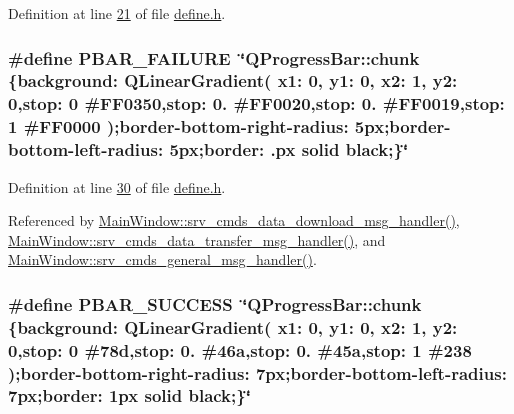Definition at line \hyperlink{a00090_source_l00021}{21} of file \hyperlink{a00090_source}{define.\+h}.

\hypertarget{a00090_aa9f43b2774395af6510910f8feed7cb4}{
\subsubsection[{P\+B\+A\+R\+\_\+\+F\+A\+I\+L\+U\+R\+E}]{\setlength{\rightskip}{0pt plus 5cm}\#define P\+B\+A\+R\+\_\+\+F\+A\+I\+L\+U\+R\+E~\char`\"{}Q\+Progress\+Bar\+::chunk \{background\+: Q\+Linear\+Gradient( x1\+: 0, y1\+: 0, x2\+: 1, y2\+: 0,stop\+: 0 \#F\+F0350,stop\+: 0. \#F\+F0020,stop\+: 0. \#F\+F0019,stop\+: 1 \#F\+F0000 );border-\/bottom-\/right-\/radius\+: 5px;border-\/bottom-\/left-\/radius\+: 5px;border\+: .\+px solid black;\}\char`\"{}}}\label{a00090_aa9f43b2774395af6510910f8feed7cb4}


Definition at line \hyperlink{a00090_source_l00030}{30} of file \hyperlink{a00090_source}{define.\+h}.



Referenced by \hyperlink{a00136_source_l00588}{Main\+Window\+::srv\+\_\+cmds\+\_\+data\+\_\+download\+\_\+msg\+\_\+handler()}, \hyperlink{a00136_source_l00437}{Main\+Window\+::srv\+\_\+cmds\+\_\+data\+\_\+transfer\+\_\+msg\+\_\+handler()}, and \hyperlink{a00136_source_l00293}{Main\+Window\+::srv\+\_\+cmds\+\_\+general\+\_\+msg\+\_\+handler()}.

\hypertarget{a00090_a1ff3389746e26aa43aed6c6b7c9997bd}{
\subsubsection[{P\+B\+A\+R\+\_\+\+S\+U\+C\+C\+E\+S\+S}]{\setlength{\rightskip}{0pt plus 5cm}\#define P\+B\+A\+R\+\_\+\+S\+U\+C\+C\+E\+S\+S~\char`\"{}Q\+Progress\+Bar\+::chunk \{background\+: Q\+Linear\+Gradient( x1\+: 0, y1\+: 0, x2\+: 1, y2\+: 0,stop\+: 0 \#78d,stop\+: 0. \#46a,stop\+: 0. \#45a,stop\+: 1 \#238 );border-\/bottom-\/right-\/radius\+: 7px;border-\/bottom-\/left-\/radius\+: 7px;border\+: 1px solid black;\}\char`\"{}}}\label{a00090_a1ff3389746e26aa43aed6c6b7c9997bd}


